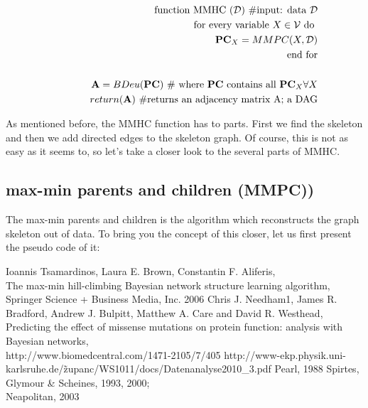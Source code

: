 		\begin{eqnarray}
			&&\textnormal{function MMHC } (\mathcal{D}) \textnormal{ \#input: data } \mathcal{D} \notag \\
				&&\hspace{10mm} \textnormal{for every variable } X \in \mathcal{V} \textnormal{ do } \notag \\
					&&\hspace{10mm}\hspace{10mm} \mat{PC}_{X} = MMPC(X, \mathcal{D}) \notag \\
				&&\hspace{10mm} \textnormal{end for} \notag \\ \notag \\
				&&\hspace{10mm} \mat{A} = BDeu(\mat{PC}) \textnormal{ \# where } \mat{PC} \textnormal{ contains all } \mat{PC}_{X} \forall X \notag \\
				&&\hspace{10mm} return(\mat{A}) \textnormal{ \#returns an adjacency matrix A; a DAG} \notag
		\end{eqnarray}

		As mentioned before, the MMHC function has to parts. First we find the skeleton and then we add directed edges to the skeleton graph. Of course, this is not as easy as it seems to, so let's take a closer look to the several parts of MMHC.

		\subsection{max-min parents and children (MMPC))}

			The max-min parents and children is the algorithm which reconstructs the graph skeleton out of data. To bring you the concept of this closer, let us first present the pseudo code of it:

\begin{thebibliography}{56}

Ioannis Tsamardinos, Laura E. Brown, Constantin F. Aliferis,\\
The max-min hill-climbing Bayesian network structure learning algorithm,\\
Springer Science + Business Media,
Inc. 2006
Chris J. Needham1, James R. Bradford, Andrew J. Bulpitt, Matthew A. Care and David R. Westhead,\\
Predicting the effect of missense mutations on protein function: analysis with Bayesian networks,\\
http://www.biomedcentral.com/1471-2105/7/405
http://www-ekp.physik.uni-karlsruhe.de/\~zupanc/WS1011/docs/Datenanalyse2010\_3.pdf
Pearl,
1988
Spirtes, Glymour \& Scheines,
1993, 2000; \\
Neapolitan,
2003

\end{thebibliography}

